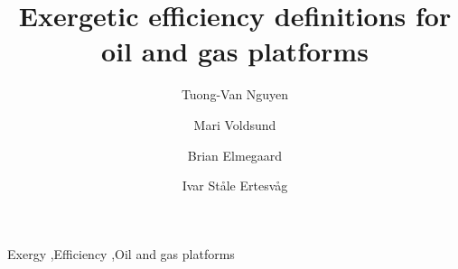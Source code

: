 \documentclass[times,3p]{elsarticle}
\begin{document}
\begin{frontmatter}

\title{Exergetic efficiency definitions for oil and gas platforms}

\author[dtu]{Tuong-Van Nguyen}  
\author[ntnu1]{Mari Voldsund} 
\author[dtu]{Brian Elmegaard} 
\author[ntnu2]{Ivar St\aa le Ertesv\aa g}  

\address[dtu]{Section of Thermal Energy, Department of Mechanical Engineering, Technical University of Denmark,\\ Building 403, Nils Koppels All\'{e}, 2800 Kongens Lyngby, Denmark}
\address[ntnu1]{Department of Chemistry, Norwegian University of Science and Technology, \\ H\o gskoleringen 5, 7491 Trondheim, Norway}
\address[ntnu2]{Department of Energy and Process Engineering, Norwegian University of Science and Technology, \\ Kolbj\o rn Hejes vei 1b., 7491 Trondheim, Norway}



\begin{keyword}
Exergy \sep Efficiency \sep Oil and gas platforms
\end{keyword}

\end{frontmatter}

%



\begin{table*}[!t]
  \begin{framed}
  \scriptsize
    \printnomenclature
  \end{framed}
\end{table*}



\tableofcontents














\end{document}
